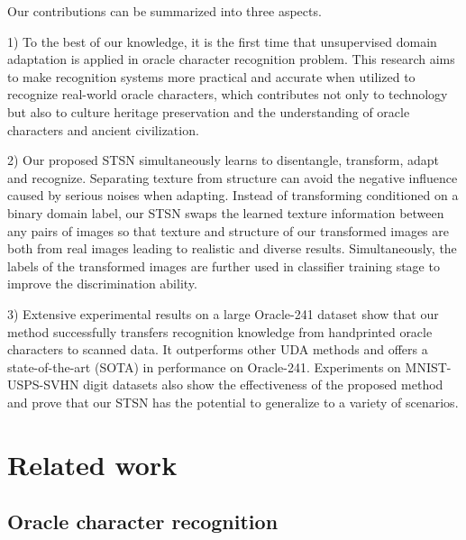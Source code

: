 \documentclass[10pt,journal,compsoc,twocolumn ]{IEEEtran}
\begin{document}
Our contributions can be summarized into three aspects.

1) To the best of our knowledge, it is the first time that unsupervised domain adaptation is applied in oracle character recognition problem. This research aims to make recognition systems more practical and accurate when utilized to recognize real-world oracle characters, which contributes not only to technology but also to culture heritage preservation and the understanding of oracle characters and ancient civilization.

2) Our proposed STSN simultaneously learns to disentangle, transform, adapt and recognize. Separating texture from structure can avoid the negative influence caused by serious noises when adapting. Instead of transforming conditioned on a binary domain label, our STSN swaps the learned texture information between any pairs of images so that texture and structure of our transformed images are both from real images leading to realistic and diverse results. Simultaneously, the labels of the transformed images are further used in classifier training stage to improve the discrimination ability.

3) Extensive experimental results on a large Oracle-241 dataset show that our method successfully transfers recognition knowledge from handprinted oracle characters to scanned data. It outperforms other UDA methods and offers a state-of-the-art (SOTA) in performance on Oracle-241. Experiments on MNIST-USPS-SVHN digit datasets also show the effectiveness of the proposed method and prove that our STSN has the potential to generalize to a variety of scenarios.


\section{Related work}

\subsection{Oracle character recognition}
\end{document}
